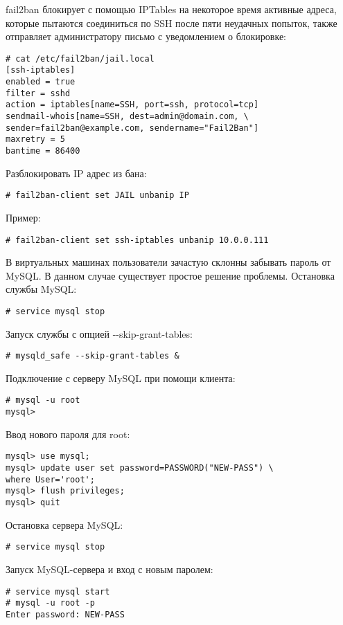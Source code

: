 fail2ban блокирует с помощью IPTables на некоторое время активные адреса, которые пытаются соединиться по SSH после пяти неудачных попыток, также отправляет администратору письмо с уведомлением о блокировке:
\begin{lstlisting}
# cat /etc/fail2ban/jail.local
[ssh-iptables]
enabled = true
filter = sshd
action = iptables[name=SSH, port=ssh, protocol=tcp]
sendmail-whois[name=SSH, dest=admin@domain.com, \
sender=fail2ban@example.com, sendername="Fail2Ban"]
maxretry = 5
bantime = 86400
\end{lstlisting}

Разблокировать IP адрес из бана:
\begin{lstlisting}
# fail2ban-client set JAIL unbanip IP
\end{lstlisting}

Пример:
\begin{lstlisting}
# fail2ban-client set ssh-iptables unbanip 10.0.0.111
\end{lstlisting}

В виртуальных машинах пользователи зачастую склонны забывать пароль от MySQL.
В данном случае существует простое решение проблемы.
Остановка службы MySQL:
\begin{lstlisting}
# service mysql stop
\end{lstlisting}

Запуск службы с опцией -{}-skip-grant-tables:
\begin{lstlisting}
# mysqld_safe --skip-grant-tables &
\end{lstlisting}

Подключение с серверу MySQL при помощи клиента:
\begin{lstlisting}
# mysql -u root
mysql>
\end{lstlisting}

Ввод нового пароля для root:
\begin{lstlisting}
mysql> use mysql;
mysql> update user set password=PASSWORD("NEW-PASS") \
where User='root';
mysql> flush privileges;
mysql> quit
\end{lstlisting}

Остановка сервера MySQL:
\begin{lstlisting}
# service mysql stop
\end{lstlisting}

Запуск MySQL-сервера и вход с новым паролем:
\begin{lstlisting}
# service mysql start
# mysql -u root -p
Enter password: NEW-PASS
\end{lstlisting}

